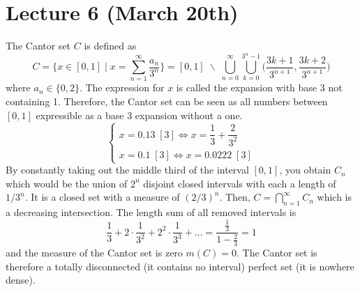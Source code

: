 \section{Lecture 6 (March 20th)}
\begin{defi}
The Cantor set $C$ is defined as
\[C=\Big\{x\in [0,1] \;|\; x=\sum _{n=1}^{\infty }\dfrac{a_{n}}{3^{n}}\Big\}=[0,1]\;\backslash\; \bigcup ^{\infty }_{n=0}\bigcup_{k=0}^{3^{n}-1}\Big(\dfrac{3k+1}{3^{n+1}},\dfrac{3k+2}{3^{n+1}}\Big)\]
where $a_{n}\in \{0,2\}$. The expression for $x$ is called the expansion with base 3 not containing 1. Therefore, the Cantor set can be seen as all numbers between $[0,1]$ expressible as a base 3 expansion without a one.
\[\begin{cases}
	x=0.13\;[3]\iff x=\dfrac{1}{3}+\dfrac{2}{3^2}\\
	x=0.1\;[3]\iff x=0.0222\;[3]
\end{cases}\]
By constantly taking out the middle third of the interval $[0,1]$, you obtain $C_{n}$ which would be the union of $2^{n}$ disjoint closed intervals with each a length of $1/3^{n}$. It is a closed set with a measure of $(2/3)^{n}$. Then, $C=\bigcap ^{\infty }_{n=1}C_{n}$ which is a decreasing intersection. The length sum of all removed intervals is
\[\dfrac{1}{3}+2\cdot \dfrac{1}{3^2}+2^2\cdot \dfrac{1}{3^3}+\ldots =\dfrac{\frac{1}{3}}{1-\frac{2}{3}}=1\]
and the measure of the Cantor set is zero $m(C)=0$. The Cantor set is therefore a totally disconnected (it contains no interval) perfect set (it is nowhere dense). 
\end{defi}
\vspace{2ex}
